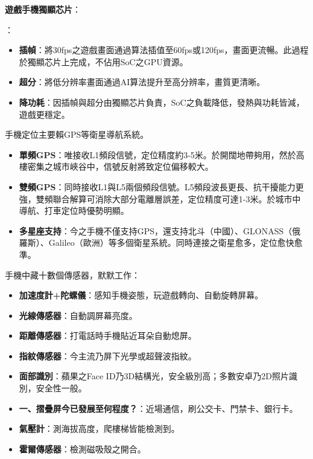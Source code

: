 \textbf{遊戲手機獨顯芯片}：

：

\begin{itemize}
  \item \textbf{插幀}：將30fps之遊戲畫面通過算法插值至60fps或120fps，畫面更流暢。此過程於獨顯芯片上完成，不佔用SoC之GPU資源。
  \item \textbf{超分}：將低分辨率畫面通過AI算法提升至高分辨率，畫質更清晰。
  \item \textbf{降功耗}：因插幀與超分由獨顯芯片負責，SoC之負載降低，發熱與功耗皆減，遊戲更穩定。
\end{itemize}


手機定位主要賴GPS等衛星導航系統。

\begin{itemize}
  \item \textbf{單頻GPS}：唯接收L1頻段信號，定位精度約3-5米。於開闊地帶夠用，然於高樓密集之城市峽谷中，信號反射將致定位偏移較大。
  \item \textbf{雙頻GPS}：同時接收L1與L5兩個頻段信號。L5頻段波長更長、抗干擾能力更強，雙頻聯合解算可消除大部分電離層誤差，定位精度可達1-3米。於城市中導航、打車定位時優勢明顯。
  \item \textbf{多星座支持}：今之手機不僅支持GPS，還支持北斗（中國）、GLONASS（俄羅斯）、Galileo（歐洲）等多個衛星系統。同時連接之衛星愈多，定位愈快愈準。
\end{itemize}


手機中藏十數個傳感器，默默工作：

\begin{itemize}
  \item \textbf{加速度計+陀螺儀}：感知手機姿態，玩遊戲轉向、自動旋轉屏幕。
  \item \textbf{光線傳感器}：自動調屏幕亮度。
  \item \textbf{距離傳感器}：打電話時手機貼近耳朵自動熄屏。
  \item \textbf{指紋傳感器}：今主流乃屏下光學或超聲波指紋。
  \item \textbf{面部識別}：蘋果之Face ID乃3D結構光，安全級別高；多數安卓乃2D照片識別，安全性一般。
  \item \textbf{一、摺疊屏今已發展至何程度？}：近場通信，刷公交卡、門禁卡、銀行卡。
  \item \textbf{氣壓計}：測海拔高度，爬樓梯皆能檢測到。
  \item \textbf{霍爾傳感器}：檢測磁吸殼之開合。
\end{itemize}

